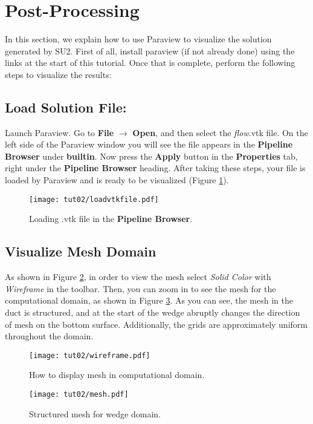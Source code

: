 \section{Post-Processing}
In this section, we explain how to use Paraview to visualize the solution generated by SU2. First of all, install paraview (if not already done) using the links at the start of this tutorial. Once that is complete, perform the following steps to visualize the results:
\subsection{Load Solution File:}
Launch Paraview. Go to \textbf{File} $\rightarrow$ \textbf{Open}, and then select the \textit{flow}.vtk file. On the left side of the Paraview window you will see the file appears in the \textbf{Pipeline Browser} under \textbf{builtin}. Now press the \textbf{Apply} button in the \textbf{Properties} tab, right under the \textbf{Pipeline Browser} heading. After taking these steps, your file is loaded by Paraview and is ready to be visualized (Figure \ref{fig2:load}).
\begin{figure}[htbp]
    \centering
    \texttt{[image: tut02/loadvtkfile.pdf]}
    \caption{Loading .vtk file in the \textbf{Pipeline Browser}.}
    \label{fig2:load}
\end{figure}
\subsection{Visualize Mesh Domain}
As shown in Figure \ref{fig2:wireframe}, in order to view the mesh select \textit{Solid Color} with \textit{Wireframe} in the toolbar. Then, you can zoom in to see the mesh for the computational domain, as shown in Figure \ref{fig2:mesh}. As you can see, the mesh in the duct is structured, and at the start of the wedge abruptly changes the direction of mesh on the bottom surface. Additionally, the grids are approximately uniform throughout the domain.
\begin{figure}[htbp]
    \centering
    \texttt{[image: tut02/wireframe.pdf]}
    \caption{How to display mesh in computational domain.}
    \label{fig2:wireframe}
\end{figure}
\begin{figure}[htbp]
    \centering
    \texttt{[image: tut02/mesh.pdf]}
    \caption{Structured mesh for wedge domain.}
    \label{fig2:mesh}
\end{figure}
